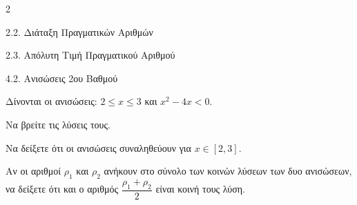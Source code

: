 \begin{ylh}{2}
    \item 2.2. Διάταξη Πραγματικών Αριθμών
    \item 2.3. Απόλυτη Τιμή Πραγματικού Αριθμού
    \item 4.2. Ανισώσεις 2ου Βαθμού
\end{ylh}
Δίνονται οι ανισώσεις: $2 \le x \le 3$ και $x^2 - 4x < 0$.

\begin{alist}
\item Να βρείτε τις λύσεις τους.
\item Να δείξετε ότι οι ανισώσεις συναληθεύουν για $x \in [2, 3]$.
\item Αν οι αριθμοί $\rho_1$ και $\rho_2$ ανήκουν στο σύνολο των κοινών λύσεων των δυο ανισώσεων, να δείξετε ότι και ο αριθμός $\dfrac{\rho_1 + \rho_2}{2}$ είναι κοινή τους λύση.
\end{alist}

